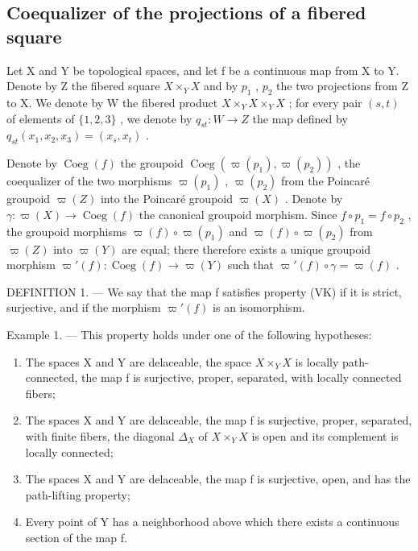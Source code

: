 \subsection{Coequalizer of the projections of a fibered square}

Let X and Y be topological spaces, and let f be a continuous map from X to Y. Denote by Z the fibered square \(X \times_{Y} X\) and by \(p_{1}\) , \(p_{2}\) the two projections from Z to X. We denote by W the fibered product \(X \times_{Y} X \times_{Y} X\) ; for every pair \((s, t)\) of elements of \(\{1,2,3\}\) , we denote by \(q_{st}: W \to Z\) the map defined by \(q_{st}(x_{1}, x_{2}, x_{3}) = (x_{s}, x_{t})\) .

Denote by \(\operatorname{Coeg}(f)\) the groupoid \(\operatorname{Coeg}(\varpi(p_{1}),\varpi(p_{2}))\) , the coequalizer of the two morphisms \(\varpi(p_{1})\) , \(\varpi(p_{2})\) from the Poincaré groupoid \(\varpi(Z)\) into the Poincaré groupoid \(\varpi(X)\) . Denote by \(\gamma\colon\varpi(X)\to\operatorname{Coeg}(f)\) the canonical groupoid morphism. Since \(f\circ p_{1}=f\circ p_{2}\) , the groupoid morphisms \(\varpi(f)\circ\varpi(p_{1})\) and \(\varpi(f)\circ\varpi(p_{2})\) from \(\varpi(Z)\) into \(\varpi(Y)\) are equal; there therefore exists a unique groupoid morphism \(\varpi'(f)\colon\operatorname{Coeg}(f)\to\varpi(Y)\) such that \(\varpi'(f)\circ\gamma=\varpi(f)\) .

DEFINITION 1. --- We say that the map f satisfies property (VK) if it is strict, surjective, and if the morphism \(\varpi'(f)\) is an isomorphism.

Example 1. --- This property holds under one of the following hypotheses:

\begin{enumerate}
\def\labelenumi{(\roman{enumi})}
\item
  The spaces X and Y are delaceable, the space \(X \times_{Y} X\) is locally path-connected, the map f is surjective, proper, separated, with locally connected fibers;
\item
  The spaces X and Y are delaceable, the map f is surjective, proper, separated, with finite fibers, the diagonal \(\Delta_{X}\) of \(X \times_{Y} X\) is open and its complement is locally connected;
\item
  The spaces X and Y are delaceable, the map f is surjective, open, and has the path-lifting property;
\item
  Every point of Y has a neighborhood above which there exists a continuous section of the map f.
\end{enumerate}

